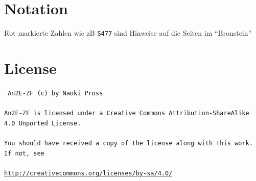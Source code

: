 \documentclass[a4paper]{article}
\numberwithin{equation}{subsection}
\newcommand{\brpage}[1]{\textcolor{red!70!black}{\small\texttt{S#1}}}
\begin{document}
\begin{multicols}{2}
\begin{thebibliography}{1}
\end{thebibliography}

\section*{Notation}
Rot markierte Zahlen wie zB \brpage{477} sind Hinweise auf die Seiten im ``Bronstein'' \cite{bronstein}

\section*{License}
{ \tt
An2E-ZF (c) by Naoki Pross
\\\\
An2E-ZF is licensed under a Creative Commons Attribution-ShareAlike 4.0 Unported License.
\\\\
You should have received a copy of the license along with this work. If not, see 
\\\\
\url{http://creativecommons.org/licenses/by-sa/4.0/}
}

\end{multicols}
\end{document}
